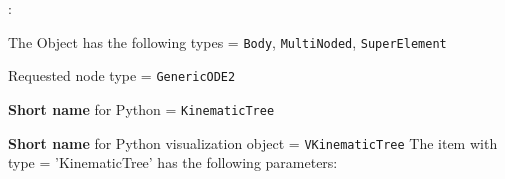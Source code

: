 \noindent {}:
\bi
  \item The Object has the following types = \texttt{Body}, \texttt{MultiNoded}, \texttt{SuperElement}
  \item Requested node type = \texttt{GenericODE2}
  \item {\bf Short name} for Python = \texttt{KinematicTree}
  \item {\bf Short name} for Python visualization object = \texttt{VKinematicTree}
\ei\vspace{12pt} \noindent 
The item  with type = 'KinematicTree' has the following parameters:
\vspace{-0.5cm}\\
\vspace{-0.5cm}\\
